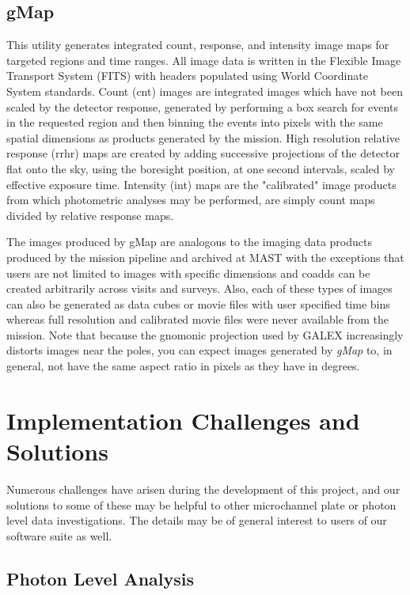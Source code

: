 \documentclass[preprint]{aastex}
\begin{document}
\subsection{gMap}
This utility generates integrated count, response, and intensity image maps for targeted regions and time ranges. All image data is written in the Flexible Image Transport System (FITS) with headers populated using World Coordinate System standards. Count (cnt) images are integrated images which have not been scaled by the detector response, generated by performing a box search for events in the requested region and then binning the events into pixels with the same spatial dimensions as products generated by the mission. High resolution relative response (rrhr) maps are created by adding successive projections of the detector flat onto the sky, using the boresight position, at one second intervals, scaled by effective exposure time. Intensity (int) maps are the "calibrated" image products from which photometric analyses may be performed, are simply count maps divided by relative response maps.

The images produced by gMap are analogous to the imaging data products produced by the mission pipeline and archived at MAST with the exceptions that users are not limited to images with specific dimensions and coadds can be created arbitrarily across visits and surveys. Also, each of these types of images can also be generated as data cubes or movie files with user specified time bins whereas full resolution and calibrated movie files were never available from the mission. Note that because the gnomonic projection used by GALEX increasingly distorts images near the poles, you can expect images generated by \textit{gMap} to, in general, not have the same aspect ratio in pixels as they have in degrees.

\section{Implementation Challenges and Solutions}
\label{implementation}
Numerous challenges have arisen during the development of this project, and our solutions to some of these may be helpful to other microchannel plate or photon level data investigations. The details may be of general interest to users of our software suite as well.

\subsection{Photon Level Analysis}
\end{document}
